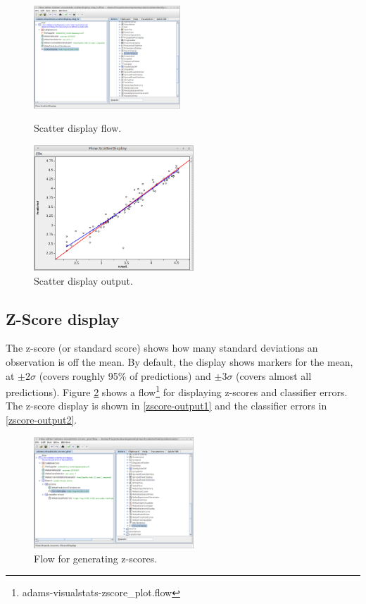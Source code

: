 \documentclass[a4paper]{book}
\begin{document}
\begin{figure}[ht]
  \begin{minipage}[t]{0.5\linewidth}
    \centering
    \includegraphics[width=5.5cm]{images/scatterdisplay-flow.png}
    \caption{Scatter display flow.}
    \label{scatterdisplay-flow}
  \end{minipage}
  \hspace{0.5cm}
  \begin{minipage}[t]{0.5\linewidth}
    \centering
    \includegraphics[width=6.0cm]{images/scatterdisplay-output.png}
    \caption{Scatter display output.}
    \label{scatterdisplay-output}
  \end{minipage}
\end{figure}

\clearpage
\subsection{Z-Score display}
The z-score (or standard score) shows how many standard deviations an
observation is off the mean. By default, the display shows markers for the mean,
at $\pm 2 \sigma$ (covers roughly 95\% of predictions) and $\pm 3 \sigma$
(covers almost all predictions). Figure \ref{zscore-flow} shows a
flow\footnote{adams-visualstats-zscore\_plot.flow} for displaying z-scores and
classifier errors. The z-score display is shown in \ref{zscore-output1} and the
classifier errors in \ref{zscore-output2}.

\begin{figure}[htb]
  \centering
  \includegraphics[width=6.0cm]{images/zscore-flow.png}
  \caption{Flow for generating z-scores.}
  \label{zscore-flow}
\end{figure}
\end{document}
